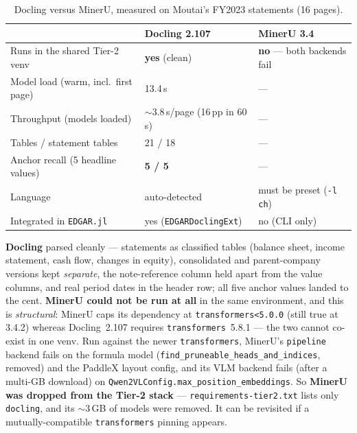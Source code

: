 \documentclass[11pt,a4paper]{report}
\begin{document}
\begin{subappendices}
\begin{table}[h]
\centering
\caption{Docling versus MinerU, measured on Moutai's FY2023 statements (16 pages).}
\label{tab:pdf-docai-measured}
\small
\begin{tabular}{@{}p{}p{}p{}@{}}
\toprule
 & \textbf{Docling 2.107} & \textbf{MinerU 3.4} \\
\midrule
Runs in the shared Tier-2 venv & \textbf{yes} (clean) & \textbf{no} --- both backends fail \\
Model load (warm, incl.\ first page) & 13.4\,s & --- \\
Throughput (models loaded) & \(\sim\)3.8\,s/page (16\,pp in 60\,s) & --- \\
Tables / statement tables & 21 / 18 & --- \\
Anchor recall (5 headline values) & \textbf{5 / 5} & --- \\
Language & auto-detected & must be preset (\texttt{-l ch}) \\
Integrated in \texttt{EDGAR.jl} & yes (\texttt{EDGARDoclingExt}) & no (CLI only) \\
\bottomrule
\end{tabular}
\end{table}

\textbf{Docling} parsed cleanly --- statements as classified tables (balance sheet, income statement, cash
flow, changes in equity), consolidated and parent-company versions kept \emph{separate}, the note-reference
column held apart from the value columns, and real period dates in the header row; all five anchor values
landed to the cent. \textbf{MinerU could not be run at all} in the same environment, and this is
\emph{structural}: MinerU caps its dependency at \texttt{transformers<5.0.0} (still true at 3.4.2) whereas
Docling~2.107 requires \texttt{transformers}~5.8.1 --- the two cannot co-exist in one venv. Run against the
newer \texttt{transformers}, MinerU's \texttt{pipeline} backend fails on the formula model
(\texttt{find\_pruneable\_heads\_and\_indices}, removed) and the PaddleX layout config, and its VLM backend
fails (after a multi-GB download) on \texttt{Qwen2VLConfig.max\_position\_embeddings}. So \textbf{MinerU was
dropped from the Tier-2 stack} --- \texttt{requirements-tier2.txt} lists only \texttt{docling}, and its
\(\sim\)3\,GB of models were removed. It can be revisited if a mutually-compatible \texttt{transformers}
pinning appears.


\end{subappendices}
\end{document}
